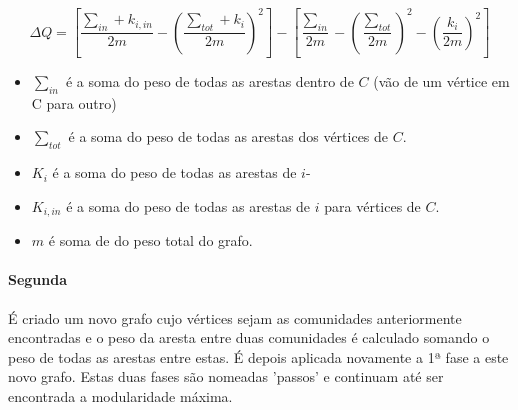 \documentclass[a4paper,10pt]{report}
\begin{document}
\[ \Delta Q  =  [\frac{\sum_{in} + k_{i,in}}{2m} - (\frac{\sum_{tot} +k_i}{2m})^2] - [\frac{\sum_{in}}{2m} - (\frac{\sum_{tot}}{2m})^2 - (\frac{k_i}{2m})^2] \]

\begin{itemize}
	\item $\sum_{in}$ é a soma do peso de todas as arestas dentro de $C$ (vão de um vértice em C para outro)
	\item $\sum_{tot}$ é a soma do peso de todas as arestas dos vértices de $C$. %
	\item $K_i$ é a soma do peso de todas as arestas de $i$- %
	\item $K_{i,in}$ é a soma do peso de todas as arestas de $i$ para vértices de $C$.
	\item $m$ é soma de do peso total do grafo.
\end{itemize}

\paragraph{Segunda}
É criado um novo grafo cujo vértices sejam as comunidades anteriormente encontradas e o peso da aresta entre duas comunidades é calculado somando o peso de todas as arestas entre estas. É depois aplicada novamente a 1ª fase a este novo grafo.
Estas duas fases são nomeadas 'passos' e continuam até ser encontrada a modularidade máxima.
\end{document}
